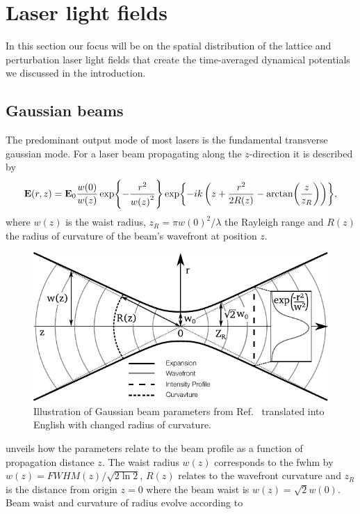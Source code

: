 \section{Laser light fields}

In this section our focus will be on the spatial distribution of the lattice
and perturbation laser light fields that create the time-averaged dynamical
potentials we discussed in the introduction.

\subsection{Gaussian beams}

The predominant output mode of most lasers is the fundamental transverse
gaussian mode. For a laser beam propagating along the $z$-direction it is
described by
\begin{equation}
  \vb{E}(r,z)
  =
  \vb{E}_0\frac{w(0)}{w(z)}
  \exp{-\frac{r^2}{w{(z)}^2}}
  \exp{-ik\left(z+\frac{r^2}{2R(z)}-\arctan(\frac{z}{z_R})\right)}
  \label{eq:gaussian_beam},
\end{equation}
where $w{(z)}$ is the waist radius, $z_R=\pi w{(0)}^2/\lambda$ the Rayleigh
range and $R(z)$ the radius of curvature of the beam's wavefront at position
$z$.
\begin{figure}[htb]
  \centering
  \includegraphics[width=.8\textwidth]{../media/image/gaussian-beam.pdf}
  \caption{Illustration of Gaussian beam parameters from Ref.~\cite{Aleph2014}
    translated into English with changed radius of curvature.
  }\label{fig:gaussian_beam}
\end{figure}
 unveils how the parameters relate to the beam
profile as a function of propagation distance $z$. The waist radius $w(z)$
corresponds to the \gls{fwhm} by $w(z)=FWHM(z)/\sqrt{2\ln2}$, $R(z)$ relates
to the wavefront curvature and $z_R$ is the distance from origin $z=0$ where
the beam waist is $w(z)=\sqrt{2}w(0)$. Beam waist and curvature of radius
evolve according to
